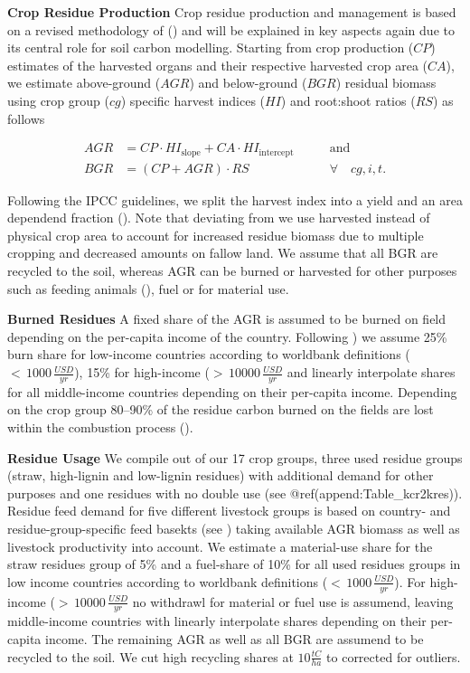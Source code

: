 \documentclass[gc, manuscript]{copernicus}
\begin{document}
\textbf{Crop Residue Production}
Crop residue production and management is based on a revised methodology of (\citep{bodirsky2012}) and will be explained in key aspects again due to its central role for soil carbon modelling. Starting from crop production (\(CP\)) estimates of the harvested organs and their respective harvested crop area (\(CA\)), we estimate above-ground (\(AGR\)) and below-ground (\(BGR\)) residual biomass using crop group (\(cg\)) specific harvest indices (\(HI\)) and root:shoot ratios (\(RS\)) as follows

\begin{equation}
\begin{aligned}
AGR & = CP \cdot HI_{\textrm{slope}} + CA \cdot HI_{\textrm{intercept}}\qquad & \textrm{and} \\
BGR & = (CP + AGR) \cdot RS \qquad                                            & \forall\quad cg, i, t.
\label{eq:resbiomass}
\end{aligned}
\end{equation}

Following the IPCC guidelines, we split the harvest index into a yield and an area dependend fraction (\citep{ipcc_2006_2006}). Note that deviating from \citep{bodirsky2012} we use harvested instead of physical crop area to account for increased residue biomass due to multiple cropping and decreased amounts on fallow land.
We assume that all BGR are recycled to the soil, whereas AGR can be burned or harvested for other purposes such as feeding animals (\citep{weindl}), fuel or for material use.

\textbf{Burned Residues}
A fixed share of the AGR is assumed to be burned on field depending on the per-capita income of the country. Following \citep{smil1999}) we assume 25\% burn share for low-income countries according to worldbank definitions (\(<\,1000\,\tfrac{USD}{yr}\)), 15\% for high-income (\(>\,10000\,\tfrac{USD}{yr}\) and linearly interpolate shares for all middle-income countries depending on their per-capita income. Depending on the crop group 80--90\% of the residue carbon burned on the fields are lost within the combustion process (\citep{ipcc_2006_2006}).

\textbf{Residue Usage}
We compile out of our 17 crop groups, three used residue groups (straw, high-lignin and low-lignin residues) with additional demand for other purposes and one residues with no double use (see @ref(append:Table\_kcr2kres)). Residue feed demand for five different livestock groups is based on country- and residue-group-specific feed basekts (see \citep{weindl}) taking available AGR biomass as well as livestock productivity into account. We estimate a material-use share for the straw residues group of 5\% and a fuel-share of 10\% for all used residues groups in low income countries according to worldbank definitions (\(<\,1000\,\tfrac{USD}{yr}\)). For high-income (\(>\,10000\,\tfrac{USD}{yr}\) no withdrawl for material or fuel use is assumend, leaving middle-income countries with linearly interpolate shares depending on their per-capita income. The remaining AGR as well as all BGR are assumend to be recycled to the soil. We cut high recycling shares at \(10\tfrac{\unit{tC}}{\unit{ha}}\) to corrected for outliers.
\end{document}
